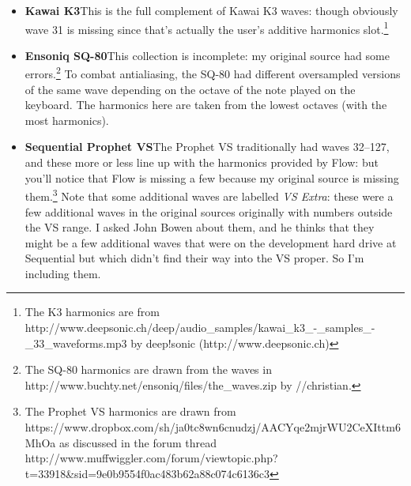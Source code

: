 \documentclass{article}
\begin{document}
\begin{itemize}

\item{\bf Kawai K3}\quad This is the full complement of Kawai K3 waves: though obviously wave 31 is missing since that's actually the user's additive harmonics slot.\footnote{The K3 harmonics are from http:/\!/www.deepsonic.ch/deep/audio\_samples/kawai\_k3\_-\_samples\_-\_33\_waveforms.mp3 by deep!sonic (http:/\!/www.deepsonic.ch)}
 
\item{\bf Ensoniq SQ-80}\quad   This collection is incomplete: my original source had some errors.\footnote{The SQ-80 harmonics are drawn from the waves in http:/\!/www.buchty.net/ensoniq/files/the\_waves.zip by /\!/christian.}  To combat antialiasing, the SQ-80 had different oversampled versions of the same wave depending on the octave of the note played on the keyboard.  The harmonics here are taken from the lowest octaves (with the most harmonics).

\item{\bf Sequential Prophet VS}\quad The Prophet VS traditionally had waves 32--127, and these more or less line up with the harmonics provided by Flow: but you'll notice that Flow is missing a few because my original source is missing them.\footnote{The Prophet VS harmonics are drawn from https:/\!/www.dropbox.com/sh/ja0tc8wn6cnudzj/AACYqe2mjrWU2CeXIttm6MhOa as discussed in the forum thread http:/\!/www.muffwiggler.com/forum/viewtopic.php?t=33918\&sid=9e0b9554f0ac483b62a88c074c6136c3}  Note that some additional waves are labelled {\it VS Extra}: these were a few additional waves in the original sources originally with numbers outside the VS range.  I asked John Bowen about them, and he thinks that they might be a few additional waves that were on the development hard drive at Sequential but which didn't find their way into the VS proper.  So I'm including them.


\end{itemize}
\end{document}
